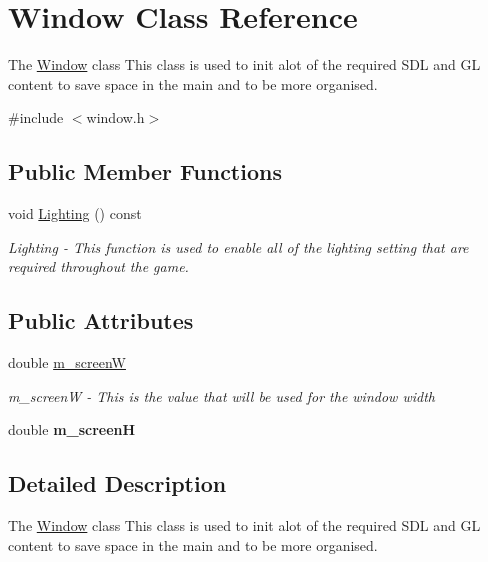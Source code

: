 \hypertarget{classWindow}{
\section{Window Class Reference}
\label{classWindow}
}


The \hyperlink{classWindow}{Window} class This class is used to init alot of the required SDL and GL content to save space in the main and to be more organised.  


{\ttfamily \#include $<$window.h$>$}\subsection*{Public Member Functions}
\begin{DoxyCompactItemize}
\item 
\hypertarget{classWindow_a92c29c75e7a71c6f126f4c8c0a5a9046}{
void \hyperlink{classWindow_a92c29c75e7a71c6f126f4c8c0a5a9046}{Lighting} () const }
\label{classWindow_a92c29c75e7a71c6f126f4c8c0a5a9046}

\begin{DoxyCompactList}\small\item\em Lighting -\/ This function is used to enable all of the lighting setting that are required throughout the game. \item\end{DoxyCompactList}\end{DoxyCompactItemize}
\subsection*{Public Attributes}
\begin{DoxyCompactItemize}
\item 
double \hyperlink{classWindow_ac85bc93bd2e5ff41e283faa81f021a63}{m\_\-screenW}
\begin{DoxyCompactList}\small\item\em m\_\-screenW -\/ This is the value that will be used for the window width \item\end{DoxyCompactList}\item 
\hypertarget{classWindow_a172eb0b7ac158130d66cce5eef0a487c}{
double {\bfseries m\_\-screenH}}
\label{classWindow_a172eb0b7ac158130d66cce5eef0a487c}

\end{DoxyCompactItemize}


\subsection{Detailed Description}
The \hyperlink{classWindow}{Window} class This class is used to init alot of the required SDL and GL content to save space in the main and to be more organised. 

